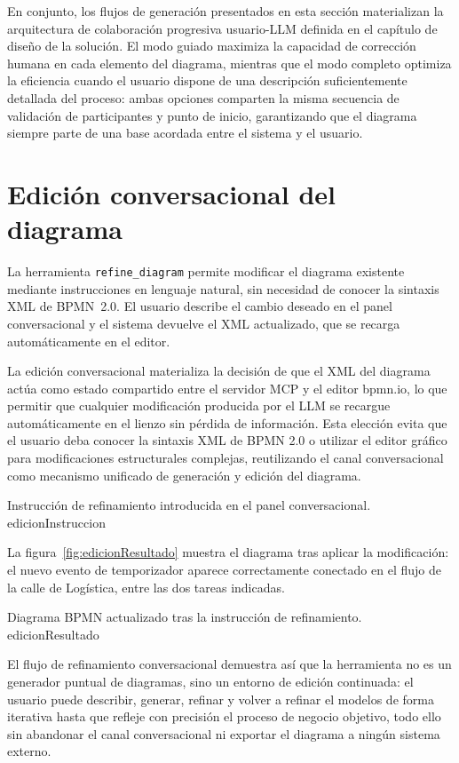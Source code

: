En conjunto, los flujos de generación presentados en esta sección materializan la arquitectura de colaboración progresiva usuario-LLM definida en el capítulo de diseño de la solución. El modo guiado maximiza la capacidad de corrección humana en cada elemento del diagrama, mientras que el modo completo optimiza la eficiencia cuando el usuario dispone de una descripción suficientemente detallada del proceso: ambas opciones comparten la misma secuencia de validación de participantes y punto de inicio, garantizando que el diagrama siempre parte de una base acordada entre el sistema y el usuario. 

\section{Edición conversacional del diagrama}
\label{sec:demoEdicion}

La herramienta \texttt{refine\_diagram} permite modificar el diagrama existente mediante instrucciones en lenguaje natural, sin necesidad de conocer la sintaxis XML de BPMN~2.0. El usuario describe el cambio deseado en el panel conversacional y el sistema devuelve el XML actualizado, que se recarga automáticamente en el editor.

La edición conversacional materializa la decisión de que el XML del diagrama actúa como estado compartido entre el servidor MCP y el editor bpmn.io, lo que permitir que cualquier modificación producida por el LLM se recargue automáticamente en el lienzo sin pérdida de información. Esta elección evita que el usuario deba conocer la sintaxis XML de BPMN 2.0 o utilizar el editor gráfico para modificaciones estructurales complejas, reutilizando el canal conversacional como mecanismo unificado de generación y edición del diagrama. 

%
  {Instrucción de refinamiento introducida en el panel conversacional.}%
  {edicionInstruccion}

La figura~\ref{fig:edicionResultado} muestra el diagrama tras aplicar la modificación: el nuevo evento de temporizador aparece correctamente conectado en el flujo de la calle de Logística, entre las dos tareas indicadas.

%
  {Diagrama BPMN actualizado tras la instrucción de refinamiento.}%
  {edicionResultado}

El flujo de refinamiento conversacional demuestra así que la herramienta no es un generador puntual de diagramas, sino un entorno de edición continuada: el usuario puede describir, generar, refinar y volver a refinar el modelos de forma iterativa hasta que refleje con precisión el proceso de negocio objetivo, todo ello sin abandonar el canal conversacional ni exportar el diagrama a ningún sistema externo.


